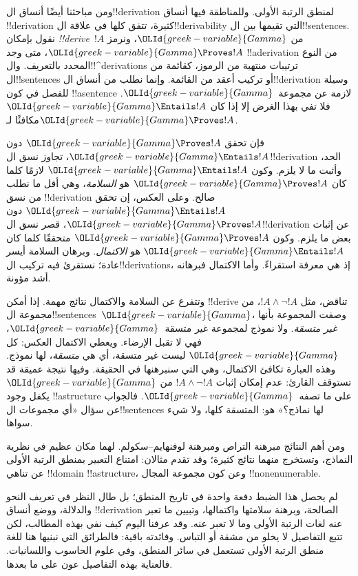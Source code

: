 \documentclass[../../../include/open-logic-section]{subfiles}
\begin{document}


ومن مباحثنا أيضًا أنساق ال!!{derivation} لمنطق الرتبة الأولى.
وللمناطقة فيها أنساق !!{derivation} كثيرة، تتفق كلها في علاقة
ال!!{derivability} التي تقيمها بين ال!!{sentence}s. نقول بإمكان
\emph{!!{derive}}~$!A$ من $\OLId{greek-variable}{Gamma}$، ونرمز
$\OLId{greek-variable}{Gamma} \Proves !A$، متى وجد !!a{derivation} من النوع المحدد
بالتعريف. وال!!^{derivation}s ترتيبات منتهية من الرموز، كقائمة من
ال!!{sentence}s أو تركيب أعقد من القائمة. وإنما نطلب من أنساق
ال!!{derivation} وسيلة للفصل في كون !!a{sentence} لازمة عن
مجموعة~$\OLId{greek-variable}{Gamma}$. فلا تفي بهذا الغرض إلا إذا كان
$\OLId{greek-variable}{Gamma} \Entails !A$ مكافئًا لـ$\OLId{greek-variable}{Gamma} \Proves !A$.

فإن تحقق $\OLId{greek-variable}{Gamma} \Proves !A$ دون $\OLId{greek-variable}{Gamma} \Entails !A$،
تجاوز نسق ال!!{derivation} الحد، وأثبت ما لا يلزم.
وكون $\OLId{greek-variable}{Gamma} \Entails !A$ لازمًا كلما كان
$\OLId{greek-variable}{Gamma} \Proves !A$ هو \emph{السلامة}، وهي أقل ما نطلب من
نسق !!{derivation} صالح. وعلى العكس، إن تحقق
$\OLId{greek-variable}{Gamma} \Entails !A$ دون $\OLId{greek-variable}{Gamma} \Proves !A$، قصر نسق
ال!!{derivation} عن إثبات بعض ما يلزم. وكون
$\OLId{greek-variable}{Gamma} \Proves !A$ متحققًا كلما كان $\OLId{greek-variable}{Gamma} \Entails !A$
هو \emph{الاكتمال}. وبرهان السلامة أيسر عادة؛ نستقرئ فيه تركيب
ال!!{derivation}s، إذ هي معرفة استقراءً. وأما الاكتمال فبرهانه
أشد مؤونة.

وتتفرع عن السلامة والاكتمال نتائج مهمة. إذا أمكن !!{derive}
تناقض، مثل $!A \land \lnot !A$، من مجموعة ال!!{sentence}s~$\OLId{greek-variable}{Gamma}$،
وصفت المجموعة بأنها \emph{غير متسقة}. ولا نموذج لمجموعة
غير متسقة~$\OLId{greek-variable}{Gamma}$، فهي لا تقبل الإرضاء. ويعطي الاكتمال
العكس: كل $\OLId{greek-variable}{Gamma}$ ليست غير متسقة، أي هي \emph{متسقة}،
لها نموذج. وهذه العبارة تكافئ الاكتمال، وهي التي سنبرهنها
في الحقيقة. وفيها نتيجة عميقة قد تستوقف القارئ: عدم إمكان إثبات
$!A \land \lnot !A$ من $\OLId{greek-variable}{Gamma}$ يكفل وجود
!!a{structure} على ما تصفه~$\OLId{greek-variable}{Gamma}$.
فالجواب عن سؤال «أي مجموعات ال!!{sentence}s لها نماذج؟»
هو: المتسقة كلها، ولا شيء سواها.

ومن أهم النتائج مبرهنة التراص ومبرهنة لوفنهايم--سكولم. لهما
مكان عظيم في نظرية النماذج، وتستخرج منهما نتائج كثيرة؛ وقد
تقدم مثالان: امتناع التعبير بمنطق الرتبة الأولى عن تناهي
!!{domain} !!a{structure}، وعن كون مجموعة المجال
!!{nonenumerable}.

لم يحصل هذا الضبط دفعة واحدة في تاريخ المنطق؛ بل طال النظر
في تعريف النحو والدلالة، ووضع أنساق !!{derivation} الصالحة،
وبرهنة سلامتها واكتمالها، وتبيين ما تعبر عنه لغات الرتبة الأولى
وما لا تعبر عنه. وقد عرفنا اليوم كيف نفي بهذه المطالب،
لكن تتبع التفاصيل لا يخلو من مشقة أو التباس. وفائدته باقية:
فالطرائق التي نبنيها هنا للغة منطق الرتبة الأولى تستعمل في
سائر المنطق، وفي علوم الحاسوب واللسانيات. فالعناية بهذه
التفاصيل عون على ما بعدها.
\end{document}
